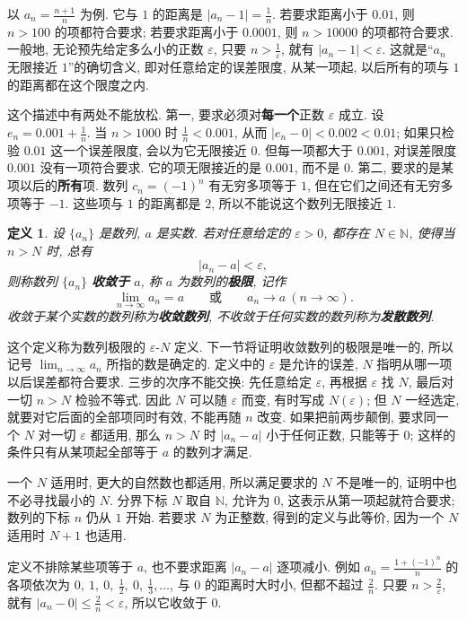 \documentclass[UTF8,openany]{ctexbook}
\theoremstyle{chinesetextbook}
\newtheorem{definition}{定义}[section]
\begin{document}
以 $\displaystyle a_n=\frac{n+1}n$ 为例. 它与 $1$ 的距离是 $\displaystyle|a_n-1|=\frac1n$. 若要求距离小于 $0.01$, 则 $n>100$ 的项都符合要求; 若要求距离小于 $0.0001$, 则 $n>10000$ 的项都符合要求. 一般地, 无论预先给定多么小的正数 $\varepsilon$, 只要 $\displaystyle n>\frac1\varepsilon$, 就有 $|a_n-1|<\varepsilon$. 这就是“$a_n$ 无限接近 $1$”的确切含义, 即对任意给定的误差限度, 从某一项起, 以后所有的项与 $1$ 的距离都在这个限度之内.

这个描述中有两处不能放松. 第一, 要求必须对\textbf{每一个}正数 $\varepsilon$ 成立. 设 $\displaystyle e_n=0.001+\frac1n$. 当 $n>1000$ 时 $\displaystyle\frac1n<0.001$, 从而 $|e_n-0|<0.002<0.01$; 如果只检验 $0.01$ 这一个误差限度, 会以为它无限接近 $0$. 但每一项都大于 $0.001$, 对误差限度 $0.001$ 没有一项符合要求. 它的项无限接近的是 $0.001$, 而不是 $0$. 第二, 要求的是某项以后的\textbf{所有}项. 数列 $c_n=(-1)^n$ 有无穷多项等于 $1$, 但在它们之间还有无穷多项等于 $-1$. 这些项与 $1$ 的距离都是 $2$, 所以不能说这个数列无限接近 $1$.
\begin{definition}
设 $\{a_n\}$ 是数列, $a$ 是实数. 若对任意给定的 $\varepsilon>0$, 都存在 $N\in\mathbb N$, 使得当 $n>N$ 时, 总有
\[
|a_n-a|<\varepsilon,
\]
则称数列 $\{a_n\}$ \textbf{收敛于} $a$, 称 $a$ 为数列的\textbf{极限}, 记作
\[
\lim_{n\to\infty}a_n=a\qquad\text{或}\qquad a_n\to a\ (n\to\infty).
\]
收敛于某个实数的数列称为\textbf{收敛数列}, 不收敛于任何实数的数列称为\textbf{发散数列}.
\end{definition}
这个定义称为数列极限的 $\varepsilon$-$N$ 定义. 下一节将证明收敛数列的极限是唯一的, 所以记号 $\displaystyle\lim_{n\to\infty}a_n$ 所指的数是确定的. 定义中的 $\varepsilon$ 是允许的误差, $N$ 指明从哪一项以后误差都符合要求. 三步的次序不能交换: 先任意给定 $\varepsilon$, 再根据 $\varepsilon$ 找 $N$, 最后对一切 $n>N$ 检验不等式. 因此 $N$ 可以随 $\varepsilon$ 而变, 有时写成 $N(\varepsilon)$; 但 $N$ 一经选定, 就要对它后面的全部项同时有效, 不能再随 $n$ 改变. 如果把前两步颠倒, 要求同一个 $N$ 对一切 $\varepsilon$ 都适用, 那么 $n>N$ 时 $|a_n-a|$ 小于任何正数, 只能等于 $0$; 这样的条件只有从某项起全部等于 $a$ 的数列才满足.

一个 $N$ 适用时, 更大的自然数也都适用, 所以满足要求的 $N$ 不是唯一的, 证明中也不必寻找最小的 $N$. 分界下标 $N$ 取自 $\mathbb N$, 允许为 $0$, 这表示从第一项起就符合要求; 数列的下标 $n$ 仍从 $1$ 开始. 若要求 $N$ 为正整数, 得到的定义与此等价, 因为一个 $N$ 适用时 $N+1$ 也适用.

定义不排除某些项等于 $a$, 也不要求距离 $|a_n-a|$ 逐项减小. 例如 $\displaystyle a_n=\frac{1+(-1)^n}n$ 的各项依次为 $\displaystyle0,\ 1,\ 0,\ \frac12,\ 0,\ \frac13,\ldots$, 与 $0$ 的距离时大时小, 但都不超过 $\displaystyle\frac2n$. 只要 $\displaystyle n>\frac2\varepsilon$, 就有 $\displaystyle|a_n-0|\le\frac2n<\varepsilon$, 所以它收敛于 $0$.
\end{document}
